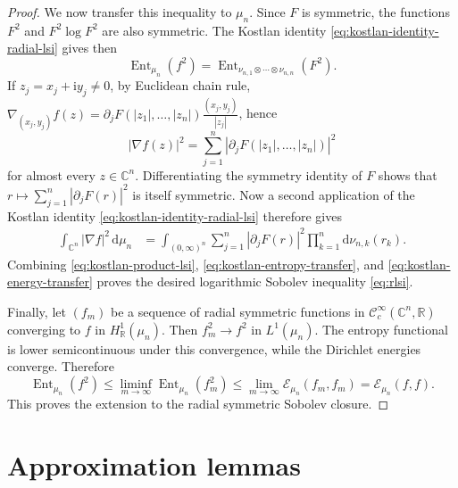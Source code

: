\documentclass[11pt,reqno]{amsart}
\numberwithin{equation}{section}%
\numberwithin{figure}{section}%
\numberwithin{table}{section}
\theoremstyle{plain}
\theoremstyle{definition}
\begin{document}
\begin{proof}
  We now transfer this inequality to $\mu_n$. Since $F$ is symmetric, the
  functions $F^2$ and $F^2\log F^2$ are also symmetric. The Kostlan identity
  \eqref{eq:kostlan-identity-radial-lsi} gives then
  \begin{equation}\label{eq:kostlan-entropy-transfer}
    \operatorname{Ent}_{\mu_n}(f^2)
    =
    \operatorname{Ent}_{\nu_{n,1}\otimes\cdots\otimes\nu_{n,n}}(F^2).
  \end{equation}
  If $z_j=x_j+\mathrm{i}y_j\neq0$, by Euclidean chain rule,
  $\nabla_{(x_j,y_j)}f(z)=\partial_jF(|z_1|,\ldots,|z_n|)\frac{(x_j,y_j)}{|z_j|}$,
  hence
  \begin{equation}\label{eq:radial-gradient-identity}
    |\nabla f(z)|^2
    =
    \sum_{j=1}^n
    \left|
      \partial_jF(|z_1|,\ldots,|z_n|)
    \right|^2
  \end{equation}
  for almost every $z\in\mathbb{C}^n$. Differentiating the symmetry identity
  of $F$ shows that $r\longmapsto\sum_{j=1}^n|\partial_jF(r)|^2$ is itself
  symmetric. Now a second application of the Kostlan identity
  \eqref{eq:kostlan-identity-radial-lsi} therefore gives
  \begin{align}
    \int_{\mathbb{C}^n}|\nabla f|^2\,\mathrm{d}\mu_n
    &=
    \int_{(0,\infty)^n}
    \sum_{j=1}^n|\partial_jF(r)|^2
    \prod_{k=1}^n\mathrm{d}\nu_{n,k}(r_k).
    \label{eq:kostlan-energy-transfer}
  \end{align}
  Combining \eqref{eq:kostlan-product-lsi},
  \eqref{eq:kostlan-entropy-transfer}, and
  \eqref{eq:kostlan-energy-transfer} proves
  the desired logarithmic Sobolev inequality \eqref{eq:rlsi}.

  Finally, let $(f_m)$ be a sequence of radial symmetric functions in
  $\mathcal{C}^\infty_c(\mathbb{C}^n,\mathbb{R})$ converging to $f$ in
  $H^1_{\mathbb{R}}(\mu_n)$. Then $f_m^2\to f^2$ in $L^1(\mu_n)$. The entropy
  functional is lower semicontinuous under this convergence, while the
  Dirichlet energies converge. Therefore
  \[
    \operatorname{Ent}_{\mu_n}(f^2)
    \leq
    \liminf_{m\to\infty}
    \operatorname{Ent}_{\mu_n}(f_m^2)
    \leq
    \lim_{m\to\infty}\mathcal{E}_{\mu_n}(f_m,f_m)
    =
    \mathcal{E}_{\mu_n}(f,f).
  \]
  This proves the extension to the radial symmetric Sobolev closure.
\end{proof}

\appendix

\section{Approximation lemmas}
\end{document}
